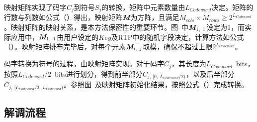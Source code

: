 映射矩阵实现了码字$C_{j}$到符号$S_{j}$的转换，矩阵中元素数量由$L_{Codeword}$决定。矩阵的行数与列数如公式（）得出，映射矩阵$\textit{\textbf{M}}$为方阵，且满足$M_{cols}\times M_{rows}\ge 2^{L_{Codeword}}$。映射矩阵的映射关系，是本方法保密性的重要环节。图\ 中$\textit{\textbf{M}}_{1,\ 1}$设定为1，而实际应用中，$\textit{\textbf{M}}_{1,\ 1}$由用户设定的$Key$及RTP中的随机字段决定，计算方法如公式（）。映射矩阵排布完毕后，对每个元素$\textit{\textbf{M}}_{i,\ j}$取模，确保不超过上限$2^{L_{Codeword}}$。

码字转换为符号的过程，由映射矩阵实现。对于码字$C_{j}$，其长度为$L_{Codeword}$\ bits，按照$L_{Codeword}/2$\ bits进行划分，得到前半部分$C_{j,\ [0,\ L_{Codeword}/2)}$，以及后半部分$C_{j,\ [L_{Codeword}/2,\ L_{Codeword})}$。参照图\ 及映射矩阵初始化结果，按照公式（）完成转换。

\subsection{解调流程}
\label{chap:zigzag:model:demodulation}

